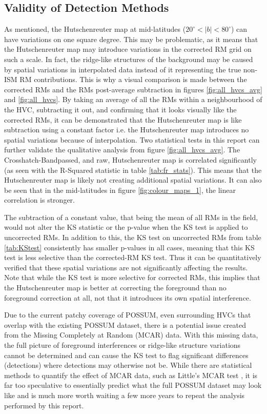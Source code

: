 \subsection{Validity of Detection Methods}
\label{ssec:B5}

As mentioned, the Hutschenreuter map at mid-latitudes ($20^\circ<|b|<80^\circ$) can have variations on one square degree. This may be problematic, as it means that the Hutschenreuter map may introduce variations in the corrected RM grid on such a scale. In fact, the ridge-like structures of the background may be caused by spatial variations in interpolated data instead of it representing the true non-ISM RM contributions. This is why a visual comparison is made between the corrected RMs and the RMs post-average subtraction in figures \ref{fig:all_hvcs_avg} and \ref{fig:all_hvcs}. By taking an average of all the RMs within a neighbourhood of the HVC, subtracting it out, and confirming that it looks visually like the corrected RMs, it can be demonstrated that the Hutschenreuter map is like subtraction using a constant factor i.e. the Hutschenreuter map introduces no spatial variations because of interpolation. Two statistical tests in this report can further validate the qualitative analysis from figure \ref{fig:all_hvcs_avg}. The Crosshatch-Bandpassed, and raw, Hutschenreuter map is correlated significantly (as seen with the R-Squared statistic in table \ref{tab:fr_stats}). This means that the Hutschenreuter map is likely not creating additional spatial variations. It can also be seen that in the mid-latitudes in figure \ref{fig:colour_maps_1}, the linear correlation is stronger.


The subtraction of a constant value, that being the mean of all RMs in the field, would not alter the KS statistic or the p-value when the KS test is applied to uncorrected RMs. In addition to this, the KS test on uncorrected RMs from table \ref{tab:KStest} consistently has smaller p-values in all cases, meaning that this KS test is less selective than the corrected-RM KS test. Thus it can be quantitatively verified that these spatial variations are not significantly affecting the results. Note that while the KS test is more selective for corrected RMs, this implies that the Hutschenreuter map is better at correcting the foreground than no foreground correction at all, not that it introduces its own spatial interference.


Due to the current patchy coverage of POSSUM, even surrounding HVCs that overlap with the existing POSSUM dataset, there is a potential issue created from the Missing Completely at Random (MCAR) data. With this missing data, the full picture of foreground interferences or ridge-like structure variations cannot be determined and can cause the KS test to flag significant differences (detections) where detections may otherwise not be. While there are statistical methods to quantify the effect of MCAR data, such as Little's MCAR test \citep{ID72}, it is far too speculative to essentially predict what the full POSSUM dataset may look like and is much more worth waiting a few more years to repeat the analysis performed by this report.


